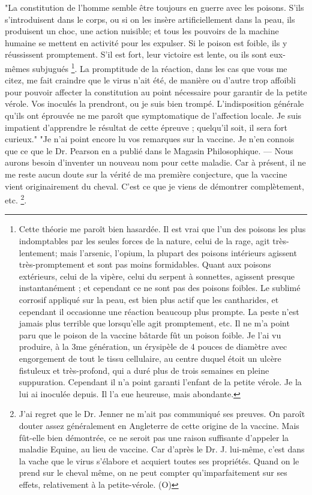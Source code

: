 "La constitution de l'homme semble être toujours en guerre avec les poisons. S'ils s'introduisent dans le corps, ou si on les insère artificiellement dans la peau, ils produisent un choc, une action nuisible; et tous les pouvoirs de la machine humaine se mettent en activité pour les expulser. Si le poison est foible, ils y réussissent promptement. S'il est fort, leur victoire est lente, ou ils sont eux-mêmes subjugués \footnote{Cette théorie me paroît bien hasardée. Il est vrai que l'un des poisons les plus indomptables par les seules forces de la nature, celui de la rage, agit très-lentement; mais l'arsenic, l'opium, la plupart des poisons intérieurs agissent très-promptement et sont pas moins formidables. Quant aux poisons extérieurs, celui de la vipère, celui du serpent à sonnettes, agissent presque instantanément ; et cependant ce ne sont pas des poisons foibles. Le sublimé corrosif appliqué sur la peau, est bien plus actif que les cantharides, et cependant il occasionne une réaction beaucoup plus prompte. La peste n'est jamais plus terrible que lorsqu'elle agit promptement, etc. Il ne m'a point paru que le poison de la vaccine bâtarde fût un poison foible. Je l'ai vu produire, à la 3me génération, un érysipèle de 4 pouces de diamètre avec engorgement de tout le tissu cellulaire, au centre duquel étoit un ulcère fistuleux et très-profond, qui a duré plus de trois semaines en pleine suppuration. Cependant il n'a point garanti l'enfant de la petite vérole. Je la lui ai inoculée depuis. Il l'a eue heureuse, mais abondante. }. La promptitude de la\setcounter{page}{278} réaction, dans les cas que vous me citez, me fait craindre que le virus n'ait été, de manière ou d'autre trop affoibli pour pouvoir affecter la constitution au point nécessaire pour garantir de la petite vérole. Vos inoculés la prendront, ou je suis bien trompé. L'indisposition générale qu'ils ont éprouvée ne me paroît que symptomatique de l'affection locale. Je suis impatient d'apprendre le résultat de cette épreuve ; quelqu'il soit, il sera fort curieux."
"Je n'ai point encore lu vos remarques sur la vaccine. Je n'en connois que ce que\setcounter{page}{279} le Dr. Pearson en a publié dans le Magasin Philosophique. — Nous aurons besoin d'inventer un nouveau nom pour cette maladie. Car à présent, il ne me reste aucun doute sur la vérité de ma première conjecture, que la vaccine vient originairement du cheval. C'est ce que je viens de démontrer complètement, etc. \footnote{J'ai regret que le Dr. Jenner ne m'ait pas communiqué ses preuves. On paroît douter assez généralement en Angleterre de cette origine de la vaccine. Mais fût-elle bien démontrée, ce ne seroit pas une raison suffisante d'appeler la maladie Equine, au lieu de vaccine. Car d'après le Dr. J. lui-même, c'est dans la vache que le virus s'élabore et acquiert toutes ses propriétés. Quand on le prend sur le cheval même, on ne peut compter qu'imparfaitement sur ses effets, relativement à la petite-vérole. (O)}.

